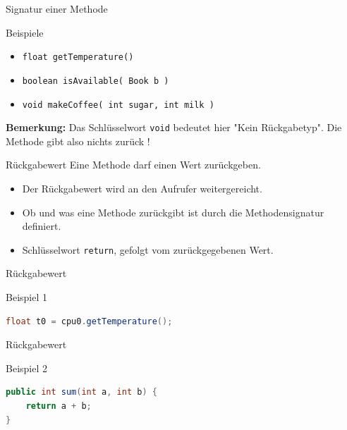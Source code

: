 \documentclass[18pt]{beamer}
\begin{document}
\begin{frame}{Signatur einer Methode}
    \begin{exampleblock}{Beispiele}
        \begin{itemize}
            \item \texttt{float getTemperature()}
            \item \texttt{boolean isAvailable( Book b )}
            \item \texttt{void makeCoffee( int sugar, int milk )}
        \end{itemize}
    \end{exampleblock}

    \pause

    \textbf{Bemerkung:} Das Schlüsselwort \texttt{void} bedeutet hier "Kein Rückgabetyp". Die Methode gibt also nichts zurück !

\end{frame}

\begin{frame}{Rückgabewert}
    Eine Methode darf einen Wert zurückgeben.
    \begin{itemize}
        \item Der Rückgabewert wird an den Aufrufer weitergereicht.
        \item Ob und was eine Methode zurückgibt ist durch die Methodensignatur definiert.
        \item Schlüsselwort \texttt{return}, gefolgt vom zurückgegebenen Wert.
    \end{itemize}

\end{frame}

\begin{frame}[fragile]{Rückgabewert}
    \begin{exampleblock}{Beispiel 1}
        \begin{lstlisting}[language=Java]
float t0 = cpu0.getTemperature();
        \end{lstlisting}
    \end{exampleblock}
\end{frame}

\begin{frame}[fragile]{Rückgabewert}
    \begin{exampleblock}{Beispiel 2}
        \begin{lstlisting}[language=Java]
public int sum(int a, int b) {
    return a + b;
}
        \end{lstlisting}
    \end{exampleblock}
\end{frame}
\end{document}

